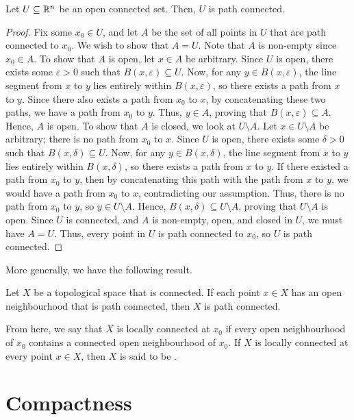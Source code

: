 \begin{theorem}
    Let $U \subseteq \mathbb{R}^{n}$ be an open connected set. Then, $U$ is path connected.
\end{theorem}
\begin{proof}
    Fix some $x_{0} \in U$, and let $A$ be the set of all points in $U$ that are path connected to $x_{0}$. We wish to show that $A = U$. Note that $A$ is non-empty since $x_{0} \in A$. To show that $A$ is open, let $x \in A$ be arbitrary. Since $U$ is open, there exists some $\varepsilon > 0$ such that $B(x,\varepsilon) \subseteq U$. Now, for any $y \in B(x,\varepsilon)$, the line segment from $x$ to $y$ lies entirely within $B(x,\varepsilon)$, so there exists a path from $x$ to $y$. Since there also exists a path from $x_{0}$ to $x$, by concatenating these two paths, we have a path from $x_{0}$ to $y$. Thus, $y \in A$, proving that $B(x,\varepsilon) \subseteq A$. Hence, $A$ is open. To show that $A$ is closed, we look at $U \setminus A$. Let $x \in U \setminus A$ be arbitrary; there is no path from $x_{0}$ to $x$. Since $U$ is open, there exists some $\delta > 0$ such that $B(x,\delta) \subseteq U$. Now, for any $y \in B(x,\delta)$, the line segment from $x$ to $y$ lies entirely within $B(x,\delta)$, so there exists a path from $x$ to $y$. If there existed a path from $x_{0}$ to $y$, then by concatenating this path with the path from $x$ to $y$, we would have a path from $x_{0}$ to $x$, contradicting our assumption. Thus, there is no path from $x_{0}$ to $y$, so $y \in U \setminus A$. Hence, $B(x,\delta) \subseteq U \setminus A$, proving that $U \setminus A$ is open. Since $U$ is connected, and $A$ is non-empty, open, and closed in $U$, we must have $A = U$. Thus, every point in $U$ is path connected to $x_{0}$, so $U$ is path connected.
\end{proof}

More generally, we have the following result.

\begin{theorem}
    Let $X$ be a topological space that is connected. If each point $x \in X$ has an open neighbourhood that is path connected, then $X$ is path connected.
\end{theorem}

From here, we say that $X$ is locally connected at $x_{0}$ if every open neighbourhood of $x_{0}$ contains a connected open neighbourhood of $x_{0}$. If $X$ is locally connected at every point $x \in X$, then $X$ is said to be .


\section{Compactness}

